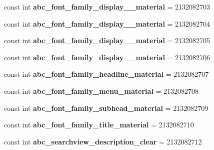 \begin{DoxyCompactItemize}
const int {\bfseries abc\+\_\+font\+\_\+family\+\_\+display\+\_\+\_\+material} = 2132082703
\item 
\mbox{\label{classst_delivery_1_1_resource_1_1_string_a6c070217776d7062e577c4e1fe9716e1}} 
const int {\bfseries abc\+\_\+font\+\_\+family\+\_\+display\+\_\+\_\+material} = 2132082704
\item 
\mbox{\label{classst_delivery_1_1_resource_1_1_string_a61b7a1a8fa1127f06204ea798db6b72f}} 
const int {\bfseries abc\+\_\+font\+\_\+family\+\_\+display\+\_\+\_\+material} = 2132082705
\item 
\mbox{\label{classst_delivery_1_1_resource_1_1_string_a9dca4487a966d87810b3fd6d6b502187}} 
const int {\bfseries abc\+\_\+font\+\_\+family\+\_\+display\+\_\+\_\+material} = 2132082706
\item 
\mbox{\label{classst_delivery_1_1_resource_1_1_string_ae5b3633801742b48676bd8698daaad84}} 
const int {\bfseries abc\+\_\+font\+\_\+family\+\_\+headline\+\_\+material} = 2132082707
\item 
\mbox{\label{classst_delivery_1_1_resource_1_1_string_a9c60f0e5ce63facb06dafd523f972de2}} 
const int {\bfseries abc\+\_\+font\+\_\+family\+\_\+menu\+\_\+material} = 2132082708
\item 
\mbox{\label{classst_delivery_1_1_resource_1_1_string_a14a3b8dc5c7fb986a832fcd08ba997d8}} 
const int {\bfseries abc\+\_\+font\+\_\+family\+\_\+subhead\+\_\+material} = 2132082709
\item 
\mbox{\label{classst_delivery_1_1_resource_1_1_string_a73298a47c605a3ddf5549bac7885c0b7}} 
const int {\bfseries abc\+\_\+font\+\_\+family\+\_\+title\+\_\+material} = 2132082710
\item 
\mbox{\label{classst_delivery_1_1_resource_1_1_string_aa90ab3a926b314ae726f3ebe69411041}} 
const int {\bfseries abc\+\_\+searchview\+\_\+description\+\_\+clear} = 2132082712

\end{DoxyCompactItemize}
